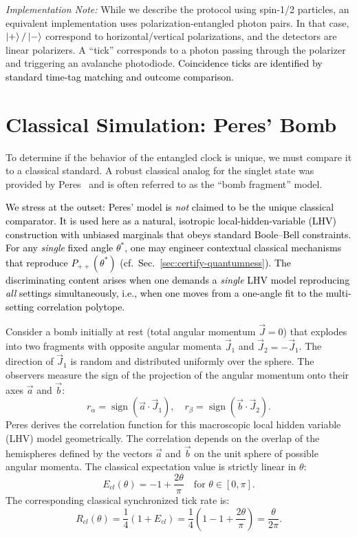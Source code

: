 \documentclass[reprint,aps,pra,longbibliography]{revtex4-2}
\DeclareMathOperator{\sign}{sign}
\newcommand{\rev}[1]{\textcolor{black}{#1}} %
\begin{document}
\textit{Implementation Note:} While we describe the protocol using spin-1/2 particles, an equivalent implementation uses polarization-entangled photon pairs. In that case, $\ket{+}/\ket{-}$ correspond to horizontal/vertical polarizations, and the detectors are linear polarizers. A ``tick'' corresponds to a photon passing through the polarizer and triggering an avalanche photodiode. \rev{Coincidence ticks are identified by standard time-tag matching and outcome comparison.}

\section{Classical Simulation: Peres' Bomb}

To determine if the behavior of the entangled clock is unique, we must compare it to a classical standard. A robust classical analog for the singlet state was provided by Peres~\cite{peres222} and is often referred to as the ``bomb fragment'' model.

\rev{We stress at the outset: Peres' model is \emph{not} claimed to be the unique classical comparator. It is used here as a natural, isotropic local-hidden-variable (LHV) construction with unbiased marginals that obeys standard Boole--Bell constraints. For any \emph{single} fixed angle $\theta^{*}$, one may engineer contextual classical mechanisms that reproduce $P_{++}(\theta^{*})$ (cf.\ Sec.~\ref{sec:certify-quantumness}). The discriminating content arises when one demands a \emph{single} LHV model reproducing \emph{all} settings simultaneously, i.e., when one moves from a one-angle fit to the multi-setting correlation polytope.}

Consider a bomb initially at rest (total angular momentum $\vec{J}=0$) that explodes into two fragments with opposite angular momenta $\vec{J}_1$ and $\vec{J}_2 = -\vec{J}_1$. The direction of $\vec{J}_1$ is random and distributed uniformly over the sphere. The observers measure the sign of the projection of the angular momentum onto their axes $\vec{a}$ and $\vec{b}$:
\begin{equation}
r_\alpha = \sign(\vec{a} \cdot \vec{J}_1), \quad r_\beta = \sign(\vec{b} \cdot \vec{J}_2).
\end{equation}
Peres derives the correlation function for this macroscopic local hidden variable (LHV) model geometrically. The correlation depends on the overlap of the hemispheres defined by the vectors $\vec{a}$ and $\vec{b}$ on the unit sphere of possible angular momenta. The classical expectation value is strictly linear in $\theta$:
\begin{equation}
E_{cl}(\theta) = -1 + \frac{2\theta}{\pi} \quad \text{for } \theta \in [0, \pi].
\label{eq:peres_corr}
\end{equation}
The corresponding classical synchronized tick rate is:
\begin{equation}
R_{cl}(\theta) = \frac{1}{4}(1 + E_{cl}) = \frac{1}{4}\left(1 - 1 + \frac{2\theta}{\pi}\right) = \frac{\theta}{2\pi}.
\label{eq:cl_rate}
\end{equation}
\end{document}

